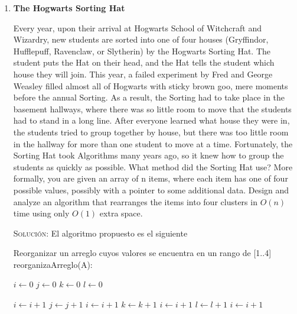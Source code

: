 \documentclass[letterpaper,11pt]{article}
\begin{document}
\begin{enumerate}
    \item \textbf{The Hogwarts Sorting Hat}

    Every year, upon their arrival at Hogwarts School of Witchcraft and Wizardry, 
    new students are sorted into one of four houses (Gryffindor, Hufflepuff, 
    Ravenclaw, or Slytherin) by the Hogwarts Sorting Hat. The student puts the 
    Hat on their head, and the Hat tells the student which house they will join. 
    This year, a failed experiment by Fred and George Weasley filled almost all 
    of Hogwarts with sticky brown goo, mere moments before the annual Sorting. 
    As a result, the Sorting had to take place in the basement hallways, where 
    there was so little room to move that the students had to stand in a long 
    line. After everyone learned what house they were in, the students tried to 
    group together by house, but there was too little room in the hallway for 
    more than one student to move at a time. Fortunately, the Sorting Hat took 
    Algorithms many years ago, so it knew how to group the students as quickly 
    as possible. What method did the Sorting Hat use? More formally, you are 
    given an array of n items, where each item has one of four possible values, 
    possibly with a pointer to some additional data. Design and analyze an 
    algorithm that rearranges the items into four clusters in $O(n)$ time 
    using only $O(1)$ extra space.

    \textsc{Solución:} El algoritmo propuesto es el siguiente 
    \begin{center}
        \begin{minipage}[c]{0.81\textwidth}
        \begin{algorithm}[H]
            \caption{Reorganizar un arreglo cuyos valores se encuentra en un 
                    rango de [1..4] \\ reorganizaArreglo(A):} 
            \begin{algorithmic}[1]
                \State $i \gets 0$ 
                \State $j \gets 0$ 
                \State $k \gets 0$ 
                \State $l \gets 0$ 

                     
                        \State $i \gets i + 1$
                        \State $j \gets j + 1$
                    \Else {} 
                        \State $i \gets i + 1$
                        \State $k \gets k + 1$
                    \Else {} 
                        \State $i \gets i + 1$
                        \State $l \gets l + 1$
                    \Else 
                        \State $i \gets i + 1$
                    \EndIf
                    \EndIf
                    \EndIf
                \EndWhile


\end{algorithmic}
\end{algorithm}
\end{minipage}
\end{center}
\end{enumerate}
\end{document}

